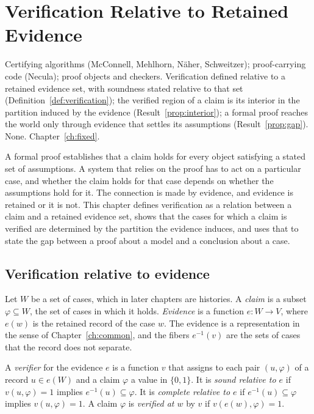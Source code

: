 \chapter{Verification Relative to Retained Evidence}\label{ch:verification}
{Certifying algorithms (McConnell, Mehlhorn, N\"aher, Schweitzer); proof-carrying code (Necula); proof objects and checkers.}
{Verification defined relative to a retained evidence set, with soundness stated relative to that set (Definition~\ref{def:verification}); the verified region of a claim is its interior in the partition induced by the evidence (Result~\ref{prop:interior}); a formal proof reaches the world only through evidence that settles its assumptions (Result~\ref{prop:gap}).}
{None.}
{Chapter~\ref{ch:fixed}.}

A formal proof establishes that a claim holds for every object satisfying a stated set of assumptions. A system that relies on the proof has to act on a particular case, and whether the claim holds for that case depends on whether the assumptions hold for it. The connection is made by evidence, and evidence is retained or it is not. This chapter defines verification as a relation between a claim and a retained evidence set, shows that the cases for which a claim is verified are determined by the partition the evidence induces, and uses that to state the gap between a proof about a model and a conclusion about a case.

\section{Verification relative to evidence}

Let $W$ be a set of cases, which in later chapters are histories. A \emph{claim} is a subset $\varphi\subseteq W$, the set of cases in which it holds. \emph{Evidence} is a function $e:W\to V$, where $e(w)$ is the retained record of the case $w$. The evidence is a representation in the sense of Chapter~\ref{ch:common}, and the fibers $e^{-1}(v)$ are the sets of cases that the record does not separate.

\begin{definition}\label{def:verification}
A \emph{verifier} for the evidence $e$ is a function $v$ that assigns to each pair $(u,\varphi)$ of a record $u\in e(W)$ and a claim $\varphi$ a value in $\{0,1\}$. It is \emph{sound relative to $e$} if $v(u,\varphi)=1$ implies $e^{-1}(u)\subseteq\varphi$. It is \emph{complete relative to $e$} if $e^{-1}(u)\subseteq\varphi$ implies $v(u,\varphi)=1$. A claim $\varphi$ is \emph{verified at $w$} by $v$ if $v(e(w),\varphi)=1$.
\end{definition}

